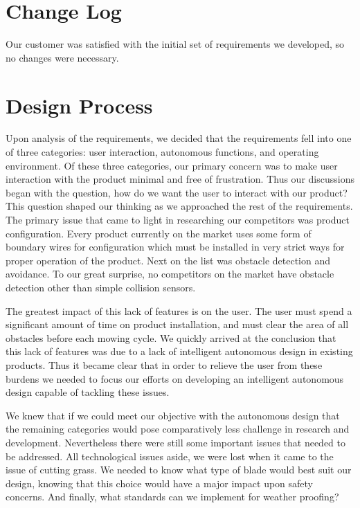 \documentclass[12pt,letterpaper]{article}
\begin{document}
\section{Change Log}

Our customer was satisfied with the initial set of requirements we developed, so
no changes were necessary.

\section{Design Process}

Upon analysis of the requirements, we decided that the requirements fell into
one of three categories:  user interaction, autonomous functions, and operating
environment.  Of these three categories, our primary concern was to make user
interaction with the product minimal and free of frustration.  Thus our
discussions began with the question, how do we want the user to interact with
our product?  This question shaped our thinking as we approached the rest of the
requirements.  The primary issue that came to light in researching our
competitors was product configuration.  Every product currently on the market
uses some form of boundary wires for configuration which must be installed in
very strict ways for proper operation of the product.  Next on the list was
obstacle detection and avoidance.  To our great surprise, no competitors on the
market have obstacle detection other than simple collision sensors.

The greatest impact of this lack of features is on the user.  The user must
spend a significant amount of time on product installation, and must clear the
area of all obstacles before each mowing cycle.  We quickly arrived at the
conclusion that this lack of features was due to a lack of intelligent
autonomous design in existing products.  Thus it became clear that in order to
relieve the user from these burdens we needed to focus our efforts on developing
 an intelligent autonomous design capable of tackling these issues.

We knew that if we could meet our objective with the autonomous design that the
remaining categories would pose comparatively less challenge in research and
development.  Nevertheless there were still some important issues that needed to
be addressed. All technological issues aside, we were lost when it came to the
issue of cutting grass.  We needed to know what type of blade would best suit
our design, knowing that this choice would have a major impact upon safety
concerns.  And finally, what standards can we implement for weather proofing?
\end{document}
